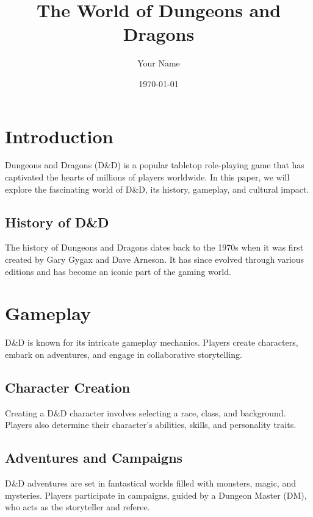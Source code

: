 \usepackage{graphicx}
\usepackage{amsmath}
\usepackage{tikz}
\usepackage{hyperref}

\title{The World of Dungeons and Dragons}
\author{Your Name}
\date{\today}


    \maketitle

    \tableofcontents
    \newpage


    \chapter{Introduction}\label{ch:introduction}
    Dungeons and Dragons (D\&D) is a popular tabletop role-playing game that has captivated the hearts of millions of players worldwide. In this paper, we will explore the fascinating world of D\&D, its history, gameplay, and cultural impact.


    \section{History of D\&D}\label{sec:history-of-d&d}
    The history of Dungeons and Dragons dates back to the 1970s when it was first created by Gary Gygax and Dave Arneson. It has since evolved through various editions and has become an iconic part of the gaming world.


    \chapter{Gameplay}\label{ch:gameplay}
    D\&D is known for its intricate gameplay mechanics. Players create characters, embark on adventures, and engage in collaborative storytelling.


    \section{Character Creation}\label{sec:character-creation}
    Creating a D\&D character involves selecting a race, class, and background. Players also determine their character's abilities, skills, and personality traits.


    \section{Adventures and Campaigns}\label{sec:adventures-and-campaigns}
    D\&D adventures are set in fantastical worlds filled with monsters, magic, and mysteries. Players participate in campaigns, guided by a Dungeon Master (DM), who acts as the storyteller and referee.


